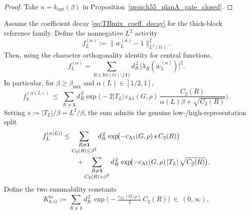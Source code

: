 \begin{proof}
Take $n=k_{\mathrm{opt}}(\beta)$ in Proposition~\ref{prop:h55_planA_gate_closed}.
\end{proof}






\begin{proposition}\label{prop:TBmix_to_f}
Assume the coefficient decay \eqref{eq:TBmix_coeff_decay} for the thick-block reference family.
Define the nonnegative $L^2$ activity
\begin{equation}\label{eq:f_activity_def}
 f_L^{(\alpha)}:=\|w_L^{(\alpha)}-1\|_{L^2(G)}^2.
\end{equation}
Then, using the character orthogonality identity for central functions,
\begin{equation}\label{eq:f_rep_sum}
 f_L^{(\alpha)}
 =\sum_{R\in\mathrm{Irr}(G)\setminus\{\mathbf 1\}} d_R^{\,2}\,\bigl|\lambda_R(w_L^{(\alpha)})\bigr|^2.
\end{equation}
In particular, for $\beta\ge\beta_{\mathrm{mix}}$ and $\alpha(L)\in[1/2,1]$,
\begin{equation}\label{eq:f_ref_bound_crossover_G}
 f_L^{(\alpha(L))}
 \ \le\
 \sum_{R\neq\mathbf 1} d_R^{\,2}
 \exp\!\Big(-2|T_L|\,c_{\mathrm{A1}}(G,\rho)\,\frac{C_2(R)}{\alpha(L)\beta+\sqrt{C_2(R)}}\Big).
\end{equation}
Setting $s:=|T_L|/\beta=L^2/\beta$, the sum admits the genuine low-/high-representation split
\begin{align}\label{eq:f_ref_bound_split_G}
 f_L^{(\alpha(L))}
 &\le
 \sum_{\substack{R\neq\mathbf 1\\ C_2(R)\le \beta^2}} d_R^{\,2}\,\exp\!\bigl(-c_{\mathrm{A1}}(G,\rho)\,s\,C_2(R)\bigr)
 \notag\\
 &\qquad+
 \sum_{\substack{R\neq\mathbf 1\\ C_2(R)> \beta^2}} d_R^{\,2}\,\exp\!\bigl(-c_{\mathrm{A1}}(G,\rho)\,|T_L|\,\sqrt{C_2(R)}\bigr).
\end{align}
Define the two summability constants
\begin{equation}\label{eq:K0lo_def}
 K^{\mathrm{lo}}_{0,G}:=\sum_{R\neq\mathbf 1} d_R^{\,2}\,\exp\!\Big(-\tfrac{c_{\mathrm{A1}}(G,\rho)}{2}\,C_2(R)\Big)
 \ \in\ (0,\infty),

\end{equation}
\end{proposition}
